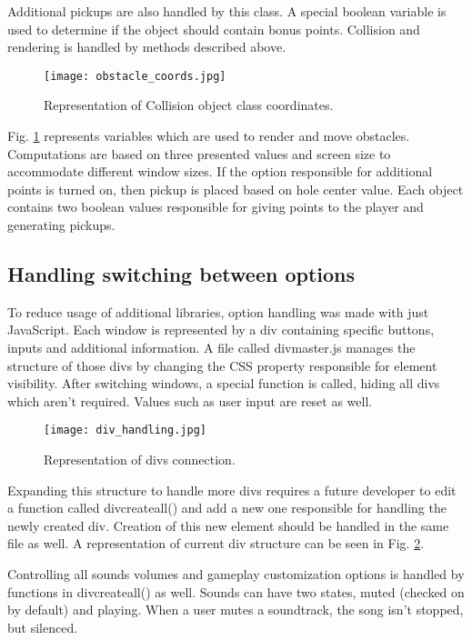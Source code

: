 \documentclass[oneside,a4paper,11pt]{report}
\begin{document}
\par
Additional pickups are also handled by this class. A special boolean variable is used to determine if the object should contain bonus points. Collision and rendering is handled by methods described above.

\begin{figure}
	\centering
	\texttt{[image: obstacle\_coords.jpg]}
	\caption{Representation of Collision object class coordinates.\label{fig:collision}}
\end{figure}
	
\par
Fig. \ref{fig:collision} represents variables which are used to render and move obstacles. Computations are based on three presented values and screen size to accommodate different window sizes. If the option responsible for additional points is turned on, then pickup is placed based on hole center value. Each object contains two boolean values responsible for giving points to the player and generating pickups.

\subsection{Handling switching between options}
To reduce usage of additional libraries, option handling was made with just JavaScript. Each window is represented by a div containing specific buttons, inputs and additional information. A file called div\textunderscore master.js manages the structure of those divs by changing the CSS property responsible for element visibility. After switching windows, a special function is called, hiding all divs which aren’t required. Values such as user input are reset as well.

\begin{figure}
	\centering
	\texttt{[image: div\_handling.jpg]}
	\caption{Representation of divs connection.\label{fig:div_handling}}
\end{figure}

\par
Expanding this structure to handle more divs requires a future developer to edit a function called div\textunderscore create\textunderscore all() and add a new one responsible for handling the newly created div. Creation of this new element should be handled in the same file as well. A representation of current div structure can be seen in Fig. \ref{fig:div_handling}.

\par
Controlling all sounds volumes and gameplay customization options is handled by functions in div\textunderscore create\textunderscore all() as well. Sounds can have two states, muted (checked on by default) and playing. When a user mutes a soundtrack, the song isn’t stopped, but silenced.
\end{document}
